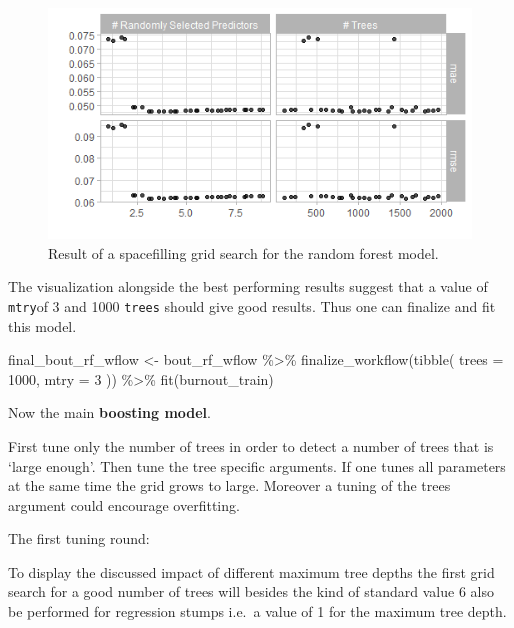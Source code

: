 \documentclass[
]{book}
\newenvironment{Shaded}{\begin{snugshade}}{\end{snugshade}}
\newcommand{\AttributeTok}[1]{\textcolor[rgb]{0.77,0.63,0.00}{#1}}
\newcommand{\DecValTok}[1]{\textcolor[rgb]{0.00,0.00,0.81}{#1}}
\newcommand{\FunctionTok}[1]{\textcolor[rgb]{0.00,0.00,0.00}{#1}}
\newcommand{\NormalTok}[1]{#1}
\newcommand{\OtherTok}[1]{\textcolor[rgb]{0.56,0.35,0.01}{#1}}
\newcommand{\SpecialCharTok}[1]{\textcolor[rgb]{0.00,0.00,0.00}{#1}}
\begin{document}
\begin{figure}

{\centering \includegraphics[width=0.7\linewidth]{_pictures/rf_burn_tune_plot} 

}

\caption{Result of a spacefilling grid search for the random forest model.}\label{fig:rfburntuneplot}
\end{figure}

The visualization alongside the best performing results suggest that a value of \texttt{mtry}of 3 and 1000 \texttt{trees} should give good results. Thus one can finalize and fit this model.

\begin{Shaded}
\begin{Highlighting}[]
\NormalTok{final\_bout\_rf\_wflow }\OtherTok{\textless{}{-}} 
\NormalTok{  bout\_rf\_wflow }\SpecialCharTok{\%\textgreater{}\%} 
  \FunctionTok{finalize\_workflow}\NormalTok{(}\FunctionTok{tibble}\NormalTok{(}
    \AttributeTok{trees =} \DecValTok{1000}\NormalTok{,}
    \AttributeTok{mtry =} \DecValTok{3}
\NormalTok{  )) }\SpecialCharTok{\%\textgreater{}\%}
  \FunctionTok{fit}\NormalTok{(burnout\_train)}
\end{Highlighting}
\end{Shaded}

Now the main \textbf{boosting model}.

First tune only the number of trees in order to detect a number of
trees that is `large enough'. Then tune the tree specific arguments.
If one tunes all parameters at the same time the grid grows to large. Moreover a tuning of the trees argument could encourage overfitting.

The first tuning round:

To display the discussed impact of different maximum tree depths the first grid search for a good number of trees will besides the kind of standard value 6 also be performed for regression stumps i.e.~a value of 1 for the maximum tree depth.
\end{document}
